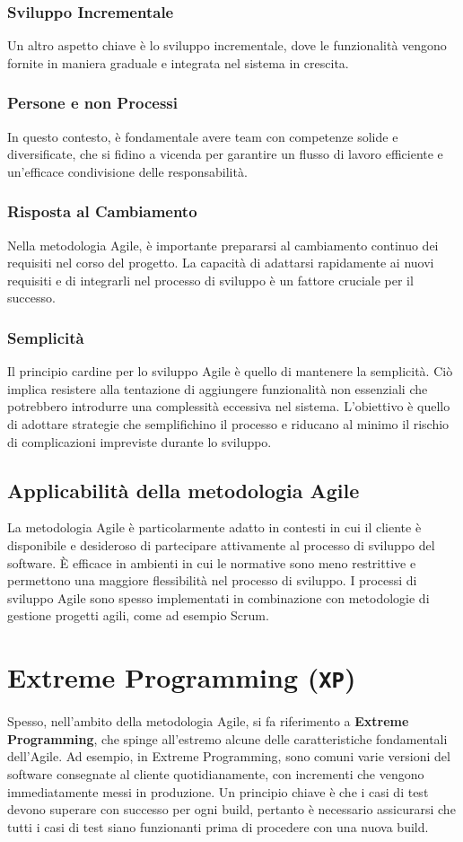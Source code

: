 \subsubsection{Sviluppo Incrementale}
Un altro aspetto chiave è lo sviluppo incrementale, dove le funzionalità vengono fornite in maniera graduale e integrata
nel sistema in crescita. 
\subsubsection{Persone e non Processi}
In questo contesto, è fondamentale avere team con competenze solide e diversificate, che si fidino
a vicenda per garantire un flusso di lavoro efficiente e un'efficace condivisione delle
responsabilità.
\subsubsection{Risposta al Cambiamento}
Nella metodologia Agile, è importante prepararsi al cambiamento continuo dei requisiti nel corso del progetto. La capacità di
adattarsi rapidamente ai nuovi requisiti e di integrarli nel processo di sviluppo è un fattore cruciale per il successo.
\subsubsection{Semplicità}
Il principio cardine per lo sviluppo Agile è quello di mantenere la semplicità. Ciò implica resistere alla tentazione di
aggiungere funzionalità non essenziali che potrebbero introdurre una complessità eccessiva nel sistema. L'obiettivo è quello
di adottare strategie che semplifichino il processo e riducano al minimo il rischio di complicazioni impreviste durante lo
sviluppo.

\subsection{Applicabilità della metodologia Agile}
La metodologia Agile è particolarmente adatto in contesti in cui il cliente è disponibile e desideroso di partecipare attivamente
al processo di sviluppo del software. È efficace in ambienti in cui le normative sono meno restrittive e permettono una maggiore
flessibilità nel processo di sviluppo. I processi di sviluppo Agile sono spesso implementati in combinazione con metodologie di
gestione progetti agili, come ad esempio Scrum.

\section{Extreme Programming (\texttt{XP})}
Spesso, nell'ambito della metodologia Agile, si fa riferimento a \textbf{Extreme Programming}, che spinge all'estremo
alcune delle caratteristiche fondamentali dell'Agile. Ad esempio, in Extreme Programming, sono comuni varie versioni del software
consegnate al cliente quotidianamente, con incrementi che vengono immediatamente messi in produzione. Un principio chiave è che i
casi di test devono superare con successo per ogni build, pertanto è necessario assicurarsi che tutti i casi di test siano funzionanti
prima di procedere con una nuova build.

